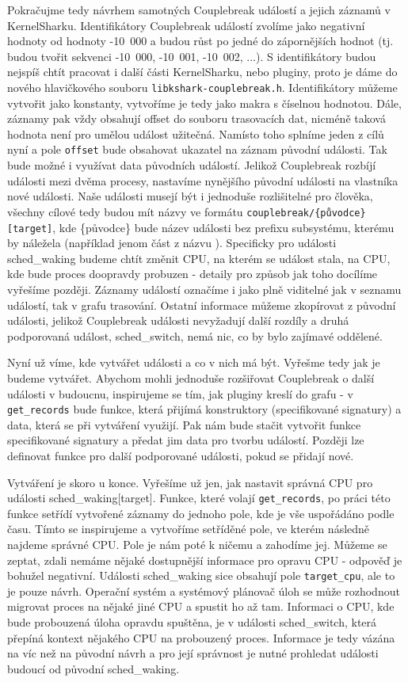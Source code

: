 Pokračujme tedy návrhem samotných Couplebreak událostí a jejich záznamů v KernelSharku. Identifikátory Couplebreak událostí zvolíme jako negativní hodnoty od hodnoty -10~000 a budou růst po jedné do zápornějších hodnot (tj. budou tvořit sekvenci -10~000, -10~001, -10~002, ...). S identifikátory budou nejspíš chtít pracovat i další části KernelSharku, nebo pluginy, proto je dáme do nového hlavičkového souboru \texttt{libkshark-couplebreak.h}. Identifikátory můžeme vytvořit jako konstanty, vytvoříme je tedy jako makra s číselnou hodnotou. Dále, záznamy pak vždy obsahují offset do souboru trasovacích dat, nicméně taková hodnota není pro umělou událost užitečná. Namísto toho splníme jeden z cílů nyní a pole \texttt{offset} bude obsahovat ukazatel na záznam původní události. Tak bude možné i využívat data původních událostí. Jelikož Couplebreak rozbíjí události mezi dvěma procesy, nastavíme nynějšího  původní události na vlastníka nové události. Naše události musejí být i jednoduše rozlišitelné pro člověka, všechny cílové tedy budou mít názvy ve formátu \texttt{couplebreak/\{původce\}[target]}, kde \{původce\} bude název události bez prefixu subsystému, kterému by náležela (například jenom část  z názvu ). Specificky pro události sched\_waking budeme chtít změnit CPU, na kterém se událost stala, na CPU, kde bude proces doopravdy probuzen - detaily pro způsob jak toho docílíme vyřešíme později. Záznamy událostí označíme i jako plně viditelné jak v seznamu událostí, tak v grafu trasování. Ostatní informace můžeme zkopírovat z původní události, jelikož Couplebreak události nevyžadují další rozdíly a druhá podporovaná událost, sched\_switch, nemá nic, co by bylo zajímavé oddělené.

Nyní už víme, kde vytvářet události a co v nich má být. Vyřešme tedy jak je budeme vytvářet. Abychom mohli jednoduše rozšiřovat Couplebreak o další události v budoucnu, inspirujeme se tím, jak pluginy kreslí do grafu - v \texttt{get\_records} bude funkce, která přijímá konstruktory (specifikované signatury) a data, která se při vytváření využijí. Pak nám bude stačit vytvořit funkce specifikované signatury a předat jim data pro tvorbu událostí. Později lze definovat funkce pro další podporované události, pokud se přidají nové. 

Vytváření je skoro u konce. Vyřešíme už jen, jak nastavit správná CPU pro události sched\_waking[target]. Funkce, které volají \texttt{get\_records}, po práci této funkce setřídí vytvořené záznamy do jednoho pole, kde je vše uspořádáno podle času. Tímto se inspirujeme a vytvoříme setříděné pole, ve kterém následně najdeme správné CPU. Pole je nám poté k ničemu a zahodíme jej. Můžeme se zeptat, zdali nemáme nějaké dostupnější informace pro opravu CPU - odpověď je bohužel negativní. Události sched\_waking sice obsahují pole \texttt{target\_cpu}, ale to je pouze návrh. Operační systém a systémový plánovač úloh se může rozhodnout migrovat proces na nějaké jiné CPU a spustit ho až tam. Informaci o CPU, kde bude probouzená úloha opravdu spuštěna, je v události sched\_switch, která přepíná kontext nějakého CPU na probouzený proces. Informace je tedy vázána na víc než na původní návrh a pro její správnost je nutné prohledat události budoucí od původní sched\_waking.

